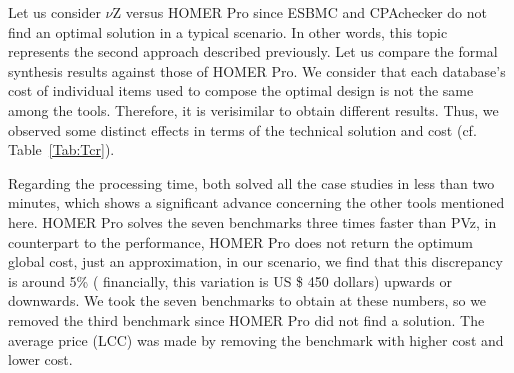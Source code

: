 \documentclass[journal]{IEEEtran}
\begin{document}
Let us consider $\nu$Z versus HOMER Pro since ESBMC and CPAchecker do not find an optimal solution in a typical scenario. In other words, this topic represents the second approach described previously. Let us compare the formal synthesis results against those of HOMER Pro. We consider that each database's cost of individual items used to compose the optimal design is not the same among the tools. Therefore, it is verisimilar to obtain different results. Thus, we observed some distinct effects in terms of the technical solution and cost (cf. Table~\ref{Tab:Tcr}). 

Regarding the processing time, both solved all the case studies in less than two minutes, which shows a significant advance concerning the other tools mentioned here. HOMER Pro solves the seven benchmarks three times faster than PVz, in counterpart to the performance, HOMER Pro does not return the optimum global cost, just an approximation, in our scenario, we find that this discrepancy is around 5\% ( financially, this variation is US \$ 450 dollars) upwards or downwards. We took the seven benchmarks to obtain at these numbers, so we removed the third benchmark since HOMER Pro did not find a solution. The average price (LCC) was made by removing the benchmark with higher cost and lower cost.
\end{document}
